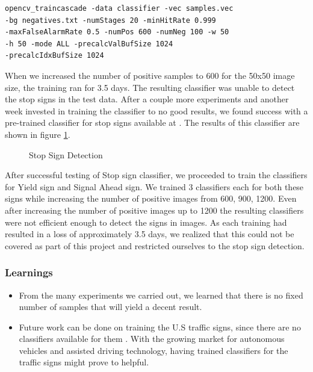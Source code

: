 \documentclass[9pt,twocolumn,twoside]{../../styles/osajnl}
\begin{document}
\begin{verbatim}
opencv_traincascade -data classifier -vec samples.vec 
-bg negatives.txt -numStages 20 -minHitRate 0.999 
-maxFalseAlarmRate 0.5 -numPos 600 -numNeg 100 -w 50 
-h 50 -mode ALL -precalcValBufSize 1024
-precalcIdxBufSize 1024
\end{verbatim}

When we increased the number of positive samples to 600 for the 50x50
image size, the training ran for 3.5 days. The resulting classifier
was unable to detect the stop signs in the test data. After a couple
more experiments and another week invested in training the classifier
to no good results, we found success with a pre-trained classifier for
stop signs available at \cite{github-stopsigns}. The results of this
classifier are shown in figure \ref{fig:detect}.

\begin{figure}[htbp]
\centering
{}
\caption{Stop Sign Detection}
\label{fig:detect}
\end{figure}

After successful testing of Stop sign classifier, we proceeded to
train the classifiers for Yield sign and Signal Ahead sign. We trained
3 classifiers each for both these signs while increasing the number of
positive images from 600, 900, 1200. Even after increasing the number
of positive images up to 1200 the resulting classifiers were not
efficient enough to detect the signs in images.  As each training had
resulted in a loss of approximately 3.5 days, we realized that this
could not be covered as part of this project and restricted ourselves
to the stop sign detection.
\subsubsection{Learnings}
\begin{itemize}
\item From the many experiments we carried out, we learned that there
  is no fixed number of samples that will yield a decent result.
\item Future work can be done on training the U.S traffic signs, since
  there are no classifiers available for them . With the growing
  market for autonomous vehicles and assisted driving technology,
  having trained classifiers for the traffic signs might prove to
  helpful.
\end{itemize}
\end{document}
